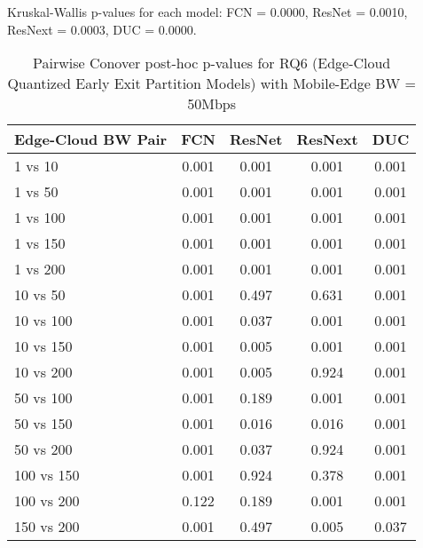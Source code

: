 \begin{table}[h]
\centering
\caption{Pairwise Conover post-hoc p-values for RQ6 (Edge-Cloud Quantized Early Exit Partition Models) with Mobile-Edge BW = 50Mbps}
\label{tab:conover_edge_cloud_quantized_earlyexit_partition_me50}
\smallskip
Kruskal-Wallis p-values for each model: FCN = 0.0000, ResNet = 0.0010, ResNext = 0.0003, DUC = 0.0000.

\begin{tabular}{lcccc}
\toprule
Edge-Cloud BW Pair & FCN & ResNet & ResNext & DUC \\
\midrule
1 vs 10 & 0.001 & 0.001 & 0.001 & 0.001 \\
1 vs 50 & 0.001 & 0.001 & 0.001 & 0.001 \\
1 vs 100 & 0.001 & 0.001 & 0.001 & 0.001 \\
1 vs 150 & 0.001 & 0.001 & 0.001 & 0.001 \\
1 vs 200 & 0.001 & 0.001 & 0.001 & 0.001 \\
10 vs 50 & 0.001 & 0.497 & 0.631 & 0.001 \\
10 vs 100 & 0.001 & 0.037 & 0.001 & 0.001 \\
10 vs 150 & 0.001 & 0.005 & 0.001 & 0.001 \\
10 vs 200 & 0.001 & 0.005 & 0.924 & 0.001 \\
50 vs 100 & 0.001 & 0.189 & 0.001 & 0.001 \\
50 vs 150 & 0.001 & 0.016 & 0.016 & 0.001 \\
50 vs 200 & 0.001 & 0.037 & 0.924 & 0.001 \\
100 vs 150 & 0.001 & 0.924 & 0.378 & 0.001 \\
100 vs 200 & 0.122 & 0.189 & 0.001 & 0.001 \\
150 vs 200 & 0.001 & 0.497 & 0.005 & 0.037 \\
\bottomrule
\end{tabular}
\end{table}

